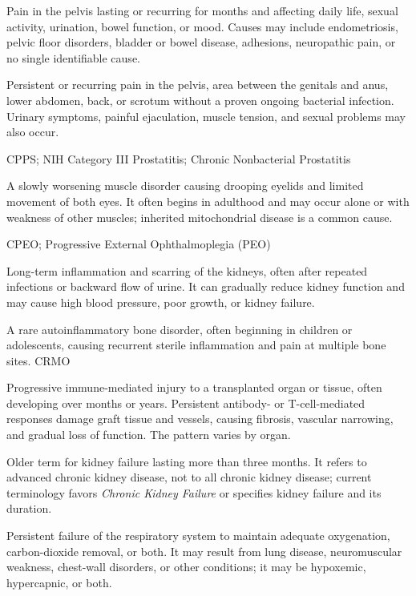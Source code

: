  Pain in the pelvis lasting or recurring for months and affecting daily life, sexual activity, urination, bowel function, or mood. Causes may include endometriosis, pelvic floor disorders, bladder or bowel disease, adhesions, neuropathic pain, or no single identifiable cause.

 Persistent or recurring pain in the pelvis, area between the genitals and anus, lower abdomen, back, or scrotum without a proven ongoing bacterial infection. Urinary symptoms, painful ejaculation, muscle tension, and sexual problems may also occur.

\synonyms
CPPS; NIH Category III Prostatitis; Chronic Nonbacterial Prostatitis

 A slowly worsening muscle disorder causing drooping eyelids and limited movement of both eyes. It often begins in adulthood and may occur alone or with weakness of other muscles; inherited mitochondrial disease is a common cause.

\synonyms
CPEO; Progressive External Ophthalmoplegia (PEO)

 Long-term inflammation and scarring of the kidneys, often after repeated infections or backward flow of urine. It can gradually reduce kidney function and may cause high blood pressure, poor growth, or kidney failure.

 A rare autoinflammatory bone disorder, often beginning in children or adolescents, causing recurrent sterile inflammation and pain at multiple bone sites.
\synonyms
CRMO

 Progressive immune-mediated injury to a transplanted organ or tissue,
often developing over months or years. Persistent antibody- or T-cell-mediated responses damage
graft tissue and vessels, causing fibrosis, vascular narrowing, and gradual loss of function. The
pattern varies by organ.

 Older term for kidney failure lasting more
than three months. It refers to advanced chronic kidney disease, not to all
chronic kidney disease; current terminology favors \textit{Chronic Kidney
Failure} or specifies kidney failure and its duration.

 Persistent failure of the respiratory
system to maintain adequate oxygenation, carbon-dioxide removal, or both. It
may result from lung disease, neuromuscular weakness, chest-wall disorders, or
other conditions; it may be hypoxemic, hypercapnic, or both.

